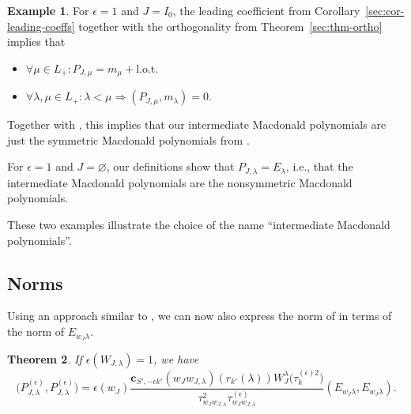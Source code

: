 \documentclass[10pt,a4paper]{amsart}
\newtheorem{Theorem}{Theorem}[section]
\theoremstyle{definition}
\newtheorem{Example}[Theorem]{Example}
\numberwithin{equation}{section}
\begin{document}
\begin{Example}
 For $\epsilon=1$ and $J=I_0$, the leading coefficient from
 Corollary~\ref{sec:cor-leading-coeffs} together with the orthogonality
 from Theorem~\ref{sec:thm-ortho} implies that
 \begin{itemize}\itemsep=0pt
 \item $\forall\mu\in L_+\colon P_{J,\mu} = m_\mu + \text{l.o.t.}$
 \item $\forall\lambda,\mu\in L_+\colon \lambda<\mu\Rightarrow (P_{J,\mu}, m_\lambda)=0$.
 \end{itemize}
 Together with \cite[Sections 5.1.35 and 5.3.1f]{macdonald}, this implies
 that our intermediate Macdonald polynomials are just the symmetric
 Macdonald polynomials from \cite[Section~5.3]{macdonald}.

 For $\epsilon=1$ and $J=\varnothing$, our definitions show that
 $P_{J,\lambda}=E_\lambda$, i.e., that the intermediate Macdonald polynomials
 are the nonsymmetric Macdonald polynomials.

 These two examples illustrate the choice of the name ``intermediate Macdonald polynomials''.
\end{Example}

\subsection{Norms}
Using an approach similar to \cite[Section~5.7.12]{macdonald}, we can now also
express the norm of  in terms of
the norm of $E_{w_J\lambda}$.


\begin{Theorem}
 If $\epsilon(W_{J,\lambda})=1$, we have
 \[
 \bigl(P^{(\epsilon)}_{J,\lambda}, P^{(\epsilon)}_{J,\lambda}\bigr)
 = \epsilon(w_J) \frac{\bm{c}_{S', -\epsilon k'}(w_Jw_{J,\lambda})(r_{k'}(\lambda)) W_J^\lambda\bigl(\tau^{(\epsilon)2}_k\bigr)}{\tau_{w_Jw_{J,\lambda}}^2\tau^{(\epsilon)}_{w_Jw_{J,\lambda}}}
 (E_{w_J\lambda}, E_{w_J\lambda}).
 \]
\end{Theorem}
\end{document}
